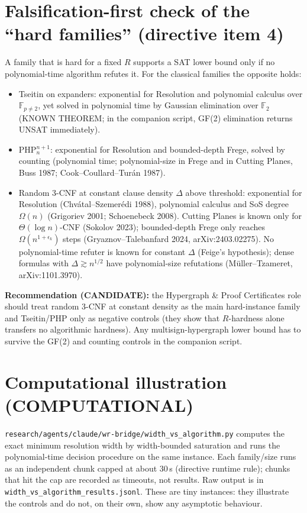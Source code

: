 \documentclass[11pt]{article}
\theoremstyle{definition}\newtheorem{definition}[theorem]{Definition}
\begin{document}
\section{Falsification-first check of the ``hard families'' (directive item 4)}
A family that is hard for a fixed $R$ supports a SAT lower bound only if no polynomial-time algorithm refutes it.
For the classical families the opposite holds:
\begin{itemize}
\item Tseitin on expanders: exponential for Resolution and polynomial calculus over $\mathbb F_{p\ne2}$, yet solved in polynomial time by
Gaussian elimination over $\mathbb F_2$ (KNOWN THEOREM; in the companion script, GF(2) elimination returns UNSAT immediately).
\item PHP$^{n+1}_n$: exponential for Resolution and bounded-depth Frege, solved by counting (polynomial time; polynomial-size in Frege
and in Cutting Planes, Buss 1987; Cook--Coullard--Turán 1987).
\item Random 3-CNF at constant clause density $\Delta$ above threshold: exponential for Resolution (Chvátal--Szemerédi 1988),
polynomial calculus and SoS degree $\Omega(n)$ (Grigoriev 2001; Schoenebeck 2008). Cutting Planes is known only for $\Theta(\log n)$-CNF
(Sokolov 2023); bounded-depth Frege only reaches $\Omega(n^{1+\epsilon_k})$ steps (Gryaznov--Talebanfard 2024, arXiv:2403.02275).
No polynomial-time refuter is known for constant $\Delta$ (Feige's hypothesis); dense formulas with $\Delta\gtrsim n^{1/2}$ have
polynomial-size refutations (Müller--Tzameret, arXiv:1101.3970).
\end{itemize}
\textbf{Recommendation (CANDIDATE):} the Hypergraph \& Proof Certificates role should treat random 3-CNF at constant density as the main
hard-instance family and Tseitin/PHP only as negative controls (they show that $R$-hardness alone transfers no algorithmic hardness).
Any multisign-hypergraph lower bound has to survive the GF(2) and counting controls in the companion script.

\section{Computational illustration (COMPUTATIONAL)}
\texttt{research/agents/claude/wr-bridge/width\_vs\_algorithm.py} computes the exact minimum resolution width by width-bounded
saturation and runs the polynomial-time decision procedure on the same instance. Each family/size runs as an independent
chunk capped at about 30\,s (directive runtime rule); chunks that hit the cap are recorded as timeouts, not results. Raw output is in
\texttt{width\_vs\_algorithm\_results.jsonl}. These are tiny instances: they illustrate the controls and do not, on their own,
show any asymptotic behaviour.
\end{document}
